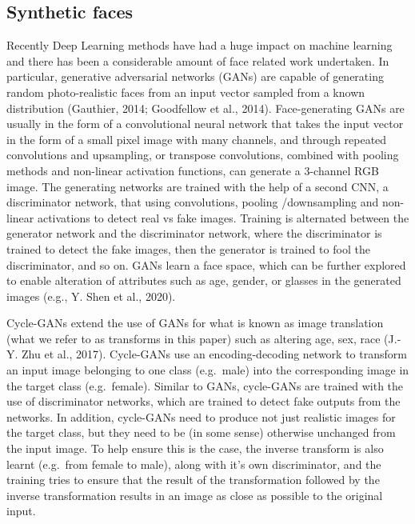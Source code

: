 \documentclass[
  man,floatsintext]{apa6}
\begin{document}
\hypertarget{synthetic-faces}{%
\subsection{Synthetic faces}\label{synthetic-faces}}

Recently Deep Learning methods have had a huge impact on machine learning and there has been a considerable amount of face related work undertaken. In particular, generative adversarial networks (GANs) are capable of generating random photo-realistic faces from an input vector sampled from a known distribution (Gauthier, 2014; Goodfellow et al., 2014). Face-generating GANs are usually in the form of a convolutional neural network that takes the input vector in the form of a small pixel image with many channels, and through repeated convolutions and upsampling, or transpose convolutions, combined with pooling methods and non-linear activation functions, can generate a 3-channel RGB image. The generating networks are trained with the help of a second CNN, a discriminator network, that using convolutions, pooling /downsampling and non-linear activations to detect real vs fake images. Training is alternated between the generator network and the discriminator network, where the discriminator is trained to detect the fake images, then the generator is trained to fool the discriminator, and so on. GANs learn a face space, which can be further explored to enable alteration of attributes such as age, gender, or glasses in the generated images (e.g., Y. Shen et al., 2020).

Cycle-GANs extend the use of GANs for what is known as image translation (what we refer to as transforms in this paper) such as altering age, sex, race (J.-Y. Zhu et al., 2017). Cycle-GANs use an encoding-decoding network to transform an input image belonging to one class (e.g.~male) into the corresponding image in the target class (e.g.~female). Similar to GANs, cycle-GANs are trained with the use of discriminator networks, which are trained to detect fake outputs from the networks. In addition, cycle-GANs need to produce not just realistic images for the target class, but they need to be (in some sense) otherwise unchanged from the input image. To help ensure this is the case, the inverse transform is also learnt (e.g.~from female to male), along with it's own discriminator, and the training tries to ensure that the result of the transformation followed by the inverse transformation results in an image as close as possible to the original input.
\end{document}
